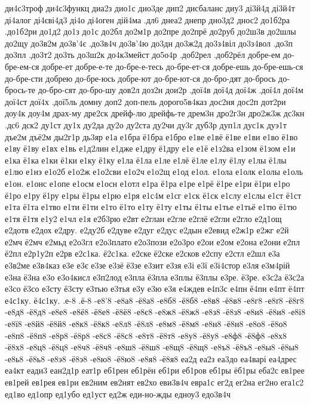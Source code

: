 {{ди4с3троф
ди4с3функц
диа2з
дио1с
дио3де
дип2
дисбаланс
диу3
ді3й4д
ді3й4т
ді4алог
ді4єві4д3
ді4о
ді4оген
дій4ма
.дл6
днеа2
днепр
дно3д2
днос2
до1б2ра
.до1б2ри
до1д2
до1з
до1с
до2бл
до2м1р
до2пре
до2прё
до2руб
до2ш3в
до2шлы
до2щу
до3в2м
до3в'4є
.до3в4ч
до3в'4ю
до3дн
до3ж2д
до3з4віл
до3з4вол
.до3п
до3пл
.до3т2
до3ть
до3ш2к
до4к3мейст
до5о4р
.доб2рел
.доб2рёл
добре-ем
до-бре-ем-ся
добре-ет
добре-е-те
до-бре-е-тесь
до-бре-ет-ся
добре-ешь
до-бре-ешь-ся
до-бре-сти
добрею
до-бре-юсь
добре-ют
до-бре-ют-ся
до-бро-дят
до-брось
до-брось-те
до-бро-сят
до-бро-шу
дов2л
доз2н
дои2р
.дої4в
дої4д
дої4ж
.дої4л
дої4м
дої4ст
дої4х
.дої5ль
домну
доп2
доп-пель
дорого5в4каз
дос2ня
дос2п
дот2ри
доу4к
доу4м
драх-му
дре2ск
дрейф-лю
дрейфь-те
дрем3н
дро2г3н
дро2ж3ж
дс3кн
.дс6
дск2
ду1ст
ду1х
ду2да
ду2о
ду2ста
ду2чи
ду3г
дуб3р
дуп1л
дус1к
дуэ1т
дъе2м
дъё2м
ды2г1р
дь3яр
е1а
е1бра
ё1бра
е1бро
е1ве
е1вё
ё1ве
е1ви
е1во
ё1во
е1ву
ё1ву
е1вх
е1вь
е1д2лин
е1дже
е1дру
ё1дру
е1е
е1ё
е1з2ва
е1зом
ё1зом
е1и
е1ка
ё1ка
е1ки
ё1ки
е1ку
ё1ку
е1ла
ё1ла
е1ле
е1лё
ё1ле
е1лу
ё1лу
е1лы
ё1лы
е1лю
е1нэ
е1о2б
е1о2ж
е1о2сви
е1о2ч
е1о2щ
е1од
е1ол.
е1ола
е1олк
е1олы
е1оль
е1он.
е1онс
е1опе
е1осм
е1осн
е1отл
е1ра
ё1ра
е1ре
е1рё
ё1ре
е1ри
ё1ри
е1ро
ё1ро
е1ру
ё1ру
е1ры
ё1ры
е1рю
е1ря
е1с4м
е1сг
е1ск
ё1ск
е1слу
е1слы
е1ст
ё1ст
е1та
ё1та
е1тво
е1ти
ё1ти
е1то
ё1то
е1ту
ё1ту
е1ты
ё1ты
е1тье
е1тьё
е1тю
ё1тю
е1тя
ё1тя
е1у2
е1чл
е1я
е2б3рю
е2вт
е2глан
е2гле
е2глё
е2гли
е2гло
е2д1ощ
е2дотв
е2дох
е2дру.
е2ду2б
е2дуве
е2дуг
е2дус
е2дын
е2евид
е2ж1р
е2жг
е2й
е2мч
ё2мч
е2мьд
е2о3гл
е2о3плато
е2о3пози
е2о3ро
е2ои
е2ом
е2она
е2они
е2пл
ё2пл
е2р1у2п
е2рв
е2с1ка.
ё2с1ка.
е2ске
ё2ске
е2сков
е2спу
е2стл
е2шл
е3а
е3в2ме
е3в4каз
е3е
е3є
е3зе
е3зё
ё3зе
е3зит
е3зя
е3і
е3ї
е3і4стор
е3ля
е3м4рій
е3на
ё3на
е3о
е3о4кисл
е3п2лод
е3пла
ё3пла
е3плы
ё3плы
е3ре.
ё3ре.
е3с2а
ё3с2а
е3со
ё3со
е3сту
ё3сту
е3тью
е3тья
е3у
е3ю
е3я
е4ждев
е4п3с
е4пн
ё4пн
е4пт
ё4пт
е4с1ку.
ё4с1ку.
.е-8
.ё-8
-е8'8
-е8а8
-ё8а8
-е8б8
-ё8б8
-е8в8
-ё8в8
-е8г8
-е8ґ8
-ё8г8
-е8д8
-ё8д8
-е8е8
-е8ё8
-ё8е8
-ё8ё8
-е8є8
-е8ж8
-ё8ж8
-е8з8
-ё8з8
-е8и8
-ё8и8
-е8і8
-е8ї8
-е8й8
-ё8й8
-е8к8
-ё8к8
-е8л8
-ё8л8
-е8м8
-ё8м8
-е8н8
-ё8н8
-е8о8
-ё8о8
-е8п8
-ё8п8
-е8р8
-ё8р8
-е8с8
-ё8с8
-е8т8
-ё8т8
-е8у8
-ё8у8
-е8ф8
-ё8ф8
-е8х8
-ё8х8
-е8ц8
-ё8ц8
-е8ч8
-ё8ч8
-е8ш8
-ё8ш8
-е8щ8
-ё8щ8
-е8ъ8
-ё8ъ8
-е8ы8
-ё8ы8
-е8ь8
-ё8ь8
-е8э8
-ё8э8
-е8ю8
-ё8ю8
-е8я8
-ё8я8
еа2д
еа2з
еа3до
еа4варі
еа4дрес
еа4кт
еади3
еан2д1р
еат1р
еб1рен
еб1рён
еб1ри
еб1ров
еб1ры
ёб1ры
еба2с
ев1рее
ев1рей
ев1рея
ев1ри
ев2ним
ев2нят
ев2хо
еви3в4ч
евра1с
ег2д
ег2на
ег2но
ега1с2
ед1во
ед1опр
ед1убо
ед1уст
ед2ж
еди-но-жды
едноу3
едо3в4ч
}}
